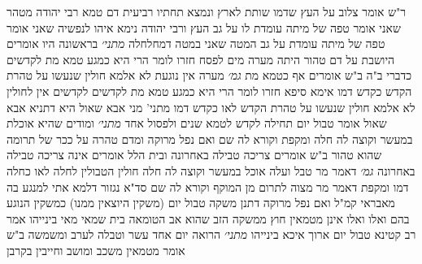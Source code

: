 \documentclass[12pt, openany]{book}
\begin{document}
{ר"ש אומר  צלוב על העץ שדמו שותת לארץ ונמצא תחתיו רביעית דם טמא  רבי יהודה מטהר שאני אומר טפה של מיתה עומדת לו על גב העץ 
ורבי יהודה נימא איהו לנפשיה  שאני אומר טפה של מיתה עומדת על גב המטה  שאני במטה דמחלחלה
{\large\emph{מתני׳}} בראשונה היו אומרים היושבת על דם טהור היתה מערה מים לפסח 
חזרו לומר  הרי היא כמגע טמא מת לקדשים כדברי ב"ה ב"ש אומרים  אף כטמא מת
{\large\emph{גמ׳}} מערה אין נוגעת לא אלמא חולין שנעשו על טהרת הקדש כקדש דמו 
אימא סיפא  חזרו לומר הרי היא כמגע טמא מת לקדשים לקדשים אין לחולין לא אלמא  חולין שנעשו על טהרת הקדש לאו כקדש דמו 
מתני' מני אבא שאול היא דתניא אבא שאול אומר  טבול יום תחילה לקדש לטמא שנים ולפסול אחד
{\large\emph{מתני׳}} ומודים שהיא אוכלת במעשר וקוצה לה חלה ומקפת וקורא לה שם 
ואם נפל מרוקה ומדם טהרה על ככר של תרומה שהוא טהור
ב"ש אומרים  צריכה טבילה באחרונה ובית הלל אומרים  אינה צריכה טבילה באחרונה
{\large\emph{גמ׳}} דאמר מר טבל ועלה אוכל במעשר
וקוצה לה חלה חולין הטבולין לחלה לאו כחלה דמו
ומקפת דאמר מר  מצוה לתרום מן המוקף
וקורא לה שם סד"א נגזור דלמא אתי למנגע בה מאבראי קמ"ל
ואם נפל מרוקה דתנן  משקה טבול יום (משקין היוצאין ממנו) כמשקין הנוגע בהם ואלו ואלו אינן מטמאין חוץ ממשקה הזב שהוא אב הטומאה
בית שמאי מאי בינייהו  אמר רב קטינא  טבול יום ארוך איכא בינייהו
{\large\emph{מתני׳}} הרואה יום אחד עשר וטבלה לערב ומשמשה 
ב"ש אומר מטמאין משכב ומושב וחייבין בקרבן}
\end{document}
